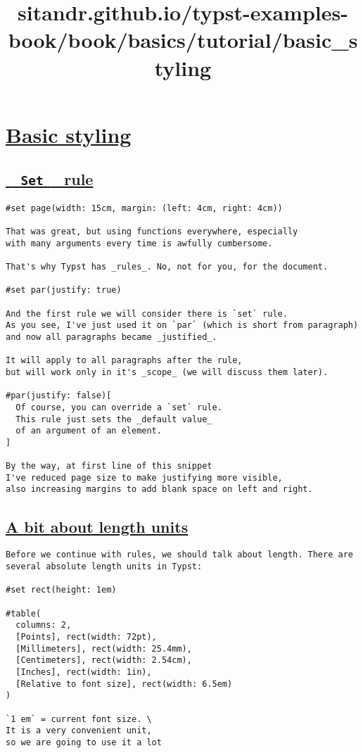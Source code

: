 \title{sitandr.github.io/typst-examples-book/book/basics/tutorial/basic_styling}

\section{\texorpdfstring{\hyperref[basic-styling]{Basic
styling}}{Basic styling}}\label{basic-styling}

\subsection{\texorpdfstring{\hyperref[set-rule]{\texttt{\ }{\texttt{\ Set\ }}\texttt{\ }
rule}}{  Set   rule}}\label{set-rule}

\begin{verbatim}
#set page(width: 15cm, margin: (left: 4cm, right: 4cm))

That was great, but using functions everywhere, especially
with many arguments every time is awfully cumbersome.

That's why Typst has _rules_. No, not for you, for the document.

#set par(justify: true)

And the first rule we will consider there is `set` rule.
As you see, I've just used it on `par` (which is short from paragraph)
and now all paragraphs became _justified_.

It will apply to all paragraphs after the rule,
but will work only in it's _scope_ (we will discuss them later).

#par(justify: false)[
  Of course, you can override a `set` rule.
  This rule just sets the _default value_
  of an argument of an element.
]

By the way, at first line of this snippet
I've reduced page size to make justifying more visible,
also increasing margins to add blank space on left and right.
\end{verbatim}

\pandocbounded{}

\subsection{\texorpdfstring{\hyperref[a-bit-about-length-units]{A bit
about length
units}}{A bit about length units}}\label{a-bit-about-length-units}

\begin{verbatim}
Before we continue with rules, we should talk about length. There are several absolute length units in Typst:

#set rect(height: 1em)

#table(
  columns: 2,
  [Points], rect(width: 72pt),
  [Millimeters], rect(width: 25.4mm),
  [Centimeters], rect(width: 2.54cm),
  [Inches], rect(width: 1in),
  [Relative to font size], rect(width: 6.5em)
)

`1 em` = current font size. \
It is a very convenient unit,
so we are going to use it a lot
\end{verbatim}

